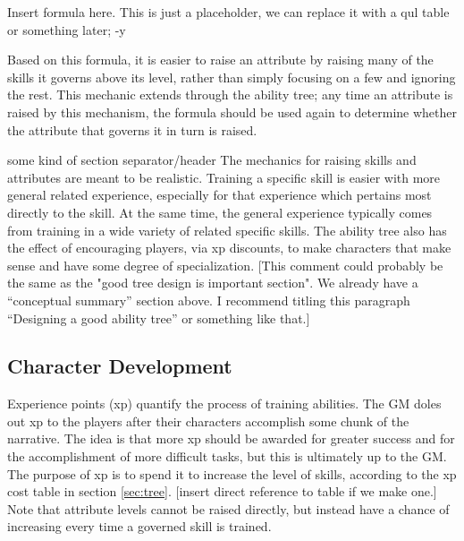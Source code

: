 \documentclass[12pt]{article}
\newcommand{\notes}[1]{{\color{Tan} #1}}
\begin{document}
\notes{Insert formula here. This is just a placeholder, we can replace it with a qul table or something later; -y}

Based on this formula, it is easier to raise an attribute by raising many of the skills it governs above its level, rather than simply focusing on a few and ignoring the rest. This mechanic extends through the ability tree; any time an attribute is raised by this mechanism, the formula should be used again to determine whether the attribute that governs it in turn is raised.

\notes{some kind of section separator/header} The mechanics for raising skills and attributes are meant to be realistic. Training a specific skill is easier with more general related experience, especially for that experience which pertains most directly to the skill. At the same time, the general experience typically comes from training in a wide variety of related specific skills. The ability tree also has the effect of encouraging players, via xp discounts, to make characters that make sense and have some degree of specialization.
\notes{[This comment could probably be the same as the "good tree design is important section".
We already have a ``conceptual summary'' section above.
I recommend titling this paragraph ``Designing a good ability tree'' or something like that.]}






\subsection{Character Development}\label{sec:dev}

Experience points (xp) quantify the process of training abilities.
The GM doles out xp to the players after their characters accomplish some chunk of the narrative.
The idea is that more xp should be awarded for greater success and for the accomplishment of more difficult tasks,
but this is ultimately up to the GM.
The purpose of xp is to spend it to increase the level of skills, according to the xp cost table in section \ref{sec:tree}.
\notes{[insert direct reference to table if we make one.]}
Note that attribute levels cannot be raised directly, but instead have a chance of increasing every time a governed skill is trained.
\end{document}
